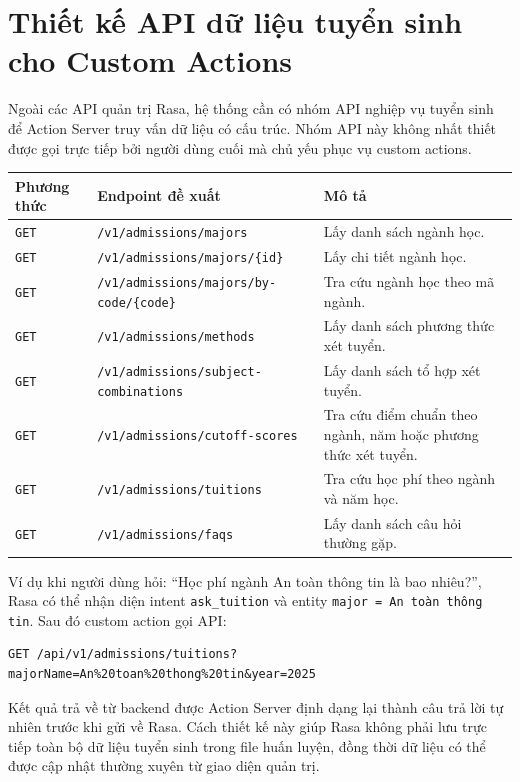 \section{Thiết kế API dữ liệu tuyển sinh cho Custom Actions}

Ngoài các API quản trị Rasa, hệ thống cần có nhóm API nghiệp vụ tuyển sinh để Action Server truy vấn dữ liệu có cấu trúc. Nhóm API này không nhất thiết được gọi trực tiếp bởi người dùng cuối mà chủ yếu phục vụ custom actions.

\begin{longtable}{|p{3cm}|p{5cm}|p{7cm}|}
\hline
\textbf{Phương thức} & \textbf{Endpoint đề xuất} & \textbf{Mô tả} \\
\hline
\texttt{GET} & \texttt{/v1/admissions/majors} & Lấy danh sách ngành học. \\
\hline
\texttt{GET} & \texttt{/v1/admissions/majors/\{id\}} & Lấy chi tiết ngành học. \\
\hline
\texttt{GET} & \texttt{/v1/admissions/majors/by-code/\{code\}} & Tra cứu ngành học theo mã ngành. \\
\hline
\texttt{GET} & \texttt{/v1/admissions/methods} & Lấy danh sách phương thức xét tuyển. \\
\hline
\texttt{GET} & \texttt{/v1/admissions/subject-combinations} & Lấy danh sách tổ hợp xét tuyển. \\
\hline
\texttt{GET} & \texttt{/v1/admissions/cutoff-scores} & Tra cứu điểm chuẩn theo ngành, năm hoặc phương thức xét tuyển. \\
\hline
\texttt{GET} & \texttt{/v1/admissions/tuitions} & Tra cứu học phí theo ngành và năm học. \\
\hline
\texttt{GET} & \texttt{/v1/admissions/faqs} & Lấy danh sách câu hỏi thường gặp. \\
\hline
\end{longtable}

Ví dụ khi người dùng hỏi: ``Học phí ngành An toàn thông tin là bao nhiêu?'', Rasa có thể nhận diện intent \texttt{ask\_tuition} và entity \texttt{major = An toàn thông tin}. Sau đó custom action gọi API:

\begin{verbatim}
GET /api/v1/admissions/tuitions?majorName=An%20toan%20thong%20tin&year=2025
\end{verbatim}

Kết quả trả về từ backend được Action Server định dạng lại thành câu trả lời tự nhiên trước khi gửi về Rasa. Cách thiết kế này giúp Rasa không phải lưu trực tiếp toàn bộ dữ liệu tuyển sinh trong file huấn luyện, đồng thời dữ liệu có thể được cập nhật thường xuyên từ giao diện quản trị.
